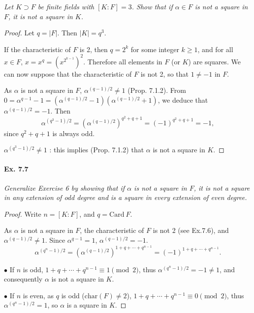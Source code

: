 \documentclass[11pt,a4paper]{article}
\begin{document}
{\it Let $K \supset F$ be finite fields with $[K:F] = 3$. Show that if $\alpha \in F$ is not a square in $F$, it is not a square in $K$.

}

\begin{proof}
Let $q = \vert F \vert$. Then $\vert K \vert = q^3.$

If the characteristic of $F$ is 2, then $q = 2^k$ for some integer $k\geq 1$, and for all $x \in F$, $x = x^q = \left (x^{2^{k-1}}\right)^2$. Therefore all elements in $F$ (or $K$) are squares.
We can now suppose that the characteristic of $F$ is not 2, so that $1 \neq -1$ in $F$.

As $\alpha$ is not a square in $F$, $\alpha^{(q-1)/2} \ne 1$ (Prop. 7.1.2). From  $0 = \alpha^{q-1} - 1 = (\alpha^{(q-1)/2}-1)(\alpha^{(q-1)/2}+1)$, we deduce that $\alpha^{(q-1)/2} = -1$. Then 
$$\alpha^{(q^3-1)/2} = (\alpha^{(q-1)/2})^{q^2+q+1} = (-1)^{q^2+q+1} = -1,$$
since $q^2+q+1$ is always odd.

$\alpha^{(q^3-1)/2} \neq 1$ : this implies (Prop. 7.1.2) that $\alpha$ is not a square in $K$.
\end{proof}

\paragraph{Ex. 7.7}

{\it  Generalize Exercise 6 by showing that if $\alpha$ is not a square in $F$, it is not a square in any extension of odd degree and is a square in every extension of even degree.

}

\begin{proof}
Write $n = [K:F]$, and $q = \mathrm{Card}\ F$.

As $\alpha$ is not a square in $F$, the characteristic of $F$ is not 2 (see Ex.7.6), and $\alpha^{(q-1)/2} \ne 1$. Since $\alpha^{q-1} = 1$, $\alpha^{(q-1)/2}= -1$.
$$\alpha^{(q^n-1)/2} =( \alpha^{(q-1)/2})^{1+q+\cdots+q^{n-1}} = (-1)^{1+q+\cdots+q^{n-1}} .$$

$\bullet$ If $n$ is odd, $1 + q +\cdots+q^{n-1} \equiv 1 \pmod 2$, thus $\alpha^{(q^n-1)/2} = -1\ne 1$, and consequently $\alpha$ is not a square in $K$.

$\bullet$ If $n$ is even, as $q$ is odd ($\mathrm{char}(F) \ne 2$), $1 + q +\cdots+q^{n-1} \equiv 0 \pmod 2$, thus $\alpha^{(q^n-1)/2} = 1$, so $\alpha$ is a square in $K$.
\end{proof}
\end{document}
